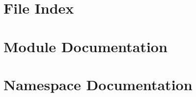 \let\mypdfximage\pdfximage\def\pdfximage{\immediate\mypdfximage}\documentclass[twoside]{book}
\newcommand{\+}{\discretionary{\mbox{\scriptsize$\hookleftarrow$}}{}{}}
\begin{document}
\chapter{File Index}

\chapter{Module Documentation}



\chapter{Namespace Documentation}























\end{document}
